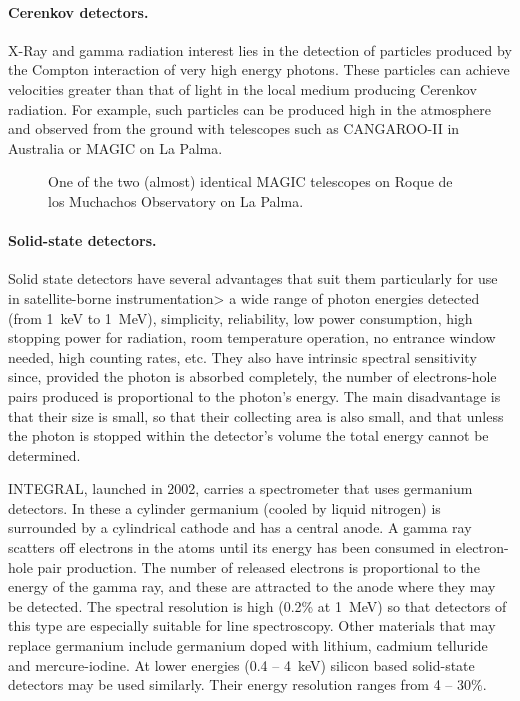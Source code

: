 \documentclass{article}
\begin{document}
\paragraph{Cerenkov detectors.} X-Ray and gamma radiation interest lies in the detection
of particles produced by the Compton interaction of very high energy photons. These
particles can achieve velocities greater than that of light in the local medium producing
Cerenkov radiation. For example, such particles can be produced high in the atmosphere 
and observed from the ground with telescopes such as CANGAROO-II in Australia or 
MAGIC on La Palma.

\begin{figure}[h]
  \centering  {}
  \caption{One of the two (almost) identical MAGIC telescopes on Roque
    de los Muchachos Observatory on La Palma.}
  \label{fig:magic}
\end{figure}                    

\paragraph{Solid-state detectors.} Solid state detectors have several advantages that suit them 
particularly for use in satellite-borne instrumentation> a wide range of photon energies
detected (from 1~keV to 1~MeV), simplicity, reliability, low power consumption, high
stopping power for radiation, room temperature operation, no entrance window needed,
high counting rates, etc. They also have intrinsic spectral sensitivity since, provided the 
photon is absorbed completely, the number of electrons-hole pairs produced is proportional
to the photon's energy. The main disadvantage is that their size is small, so that their 
collecting area is also small, and that unless the photon is stopped within the detector's
volume the total energy cannot be determined. 

INTEGRAL, launched in 2002, carries a spectrometer that uses germanium detectors. In these
a cylinder germanium (cooled by liquid nitrogen) is surrounded by a cylindrical cathode and has
a central anode. A gamma ray scatters off electrons in the atoms until its energy has been
consumed in electron-hole pair production. The number of released electrons is proportional
to the energy of the gamma ray, and these are attracted to the anode where they may be
detected. The spectral resolution is high (0.2\% at 1~MeV) so that detectors of this type
are especially suitable for line spectroscopy. Other materials that may replace germanium
include germanium doped with lithium, cadmium telluride and mercure-iodine. At lower energies
(0.4 -- 4~keV) silicon based  solid-state detectors may be used similarly. Their energy resolution
ranges from 4 -- 30\%.
\end{document}
